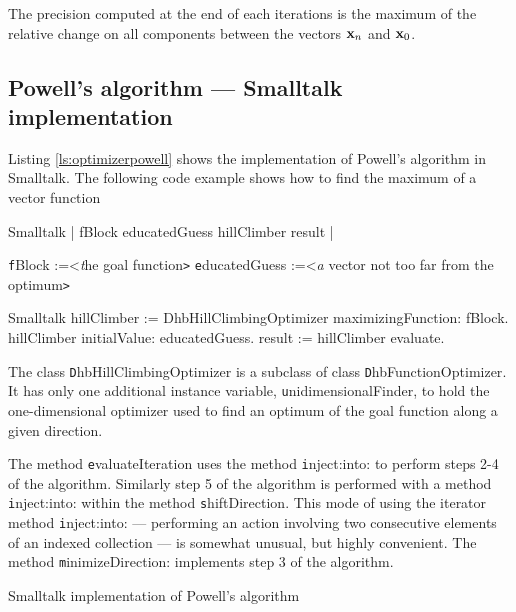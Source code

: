 The precision computed  at the end of each iterations is the
maximum of the relative change on all components between the
vectors ${\textbf x}_n$ and ${\textbf x}_0$.

\subsection{Powell's algorithm --- Smalltalk implementation}
 Listing \ref{ls:optimizerpowell}
shows the implementation of Powell's algorithm in Smalltalk. The
following code example shows how to find the maximum of a vector
function

\begin{listing}[label=ex:spowell]{Smalltalk}
{}
 | fBlock educatedGuess hillClimber result |
\end{listing}
 {\texttt fBlock :=<\textsl the goal function\texttt >}\hfil\break
 {\texttt educatedGuess :=<\textsl a vector not too far from the optimum\texttt >}
\begin{displaycode}{Smalltalk}
 hillClimber := DhbHillClimbingOptimizer maximizingFunction: fBlock.
 hillClimber initialValue: educatedGuess.
 result := hillClimber evaluate.
\end{displaycode}
The class {\texttt DhbHillClimbingOptimizer} is a subclass of class
{\texttt DhbFunctionOptimizer}. It has only one additional instance
variable, {\texttt unidimensionalFinder}, to hold the one-dimensional
optimizer used to find an optimum of the goal function along a
given direction.

The method {\texttt evaluateIteration} uses the method {\texttt
inject:into:} to perform steps 2-4 of the algorithm. Similarly
step 5 of the algorithm is performed with a method {\texttt
inject:into:} within the method {\texttt shiftDirection}. This mode of
using the iterator method {\texttt inject:into:} --- performing an
action involving two consecutive elements of an indexed collection
--- is somewhat unusual, but highly convenient\cite{Beck}. The method {\texttt
minimizeDirection:} implements step 3 of the algorithm.

\begin{listing} Smalltalk implementation of Powell's algorithm
\label{ls:optimizerpowell}

\end{listing}

